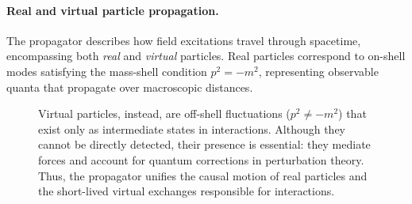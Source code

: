\paragraph{Real and virtual particle propagation.}
The propagator describes how field excitations travel through spacetime, encompassing both \textit{real} and \textit{virtual} particles.
Real particles correspond to on-shell modes satisfying the mass-shell condition \(p^2 = -m^2\), representing observable quanta that propagate over macroscopic distances.
\begin{figure}[H]
    \begin{minipage}{0.55\textwidth}
        Virtual particles, instead, are off-shell fluctuations (\(p^2 \neq -m^2\)) that exist only as intermediate states in interactions.
        Although they cannot be directly detected, their presence is essential: they mediate forces and account for quantum corrections in perturbation theory.
        Thus, the propagator unifies the causal motion of real particles and the short-lived virtual exchanges responsible for interactions.
    \end{minipage}
    \hfill
    \begin{minipage}{0.4\textwidth}
        \centering
    \end{minipage}
\end{figure}



